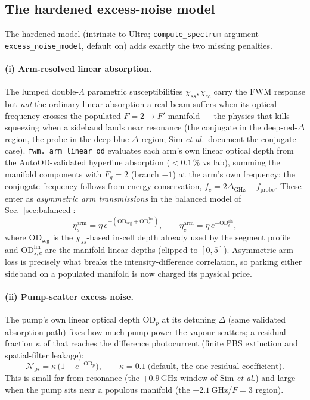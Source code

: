 \documentclass[11pt]{article}
\newcommand{\code}[1]{\texttt{#1}}
\begin{document}
\subsection{The hardened excess-noise model}

The hardened model (intrinsic to Ultra; \code{compute\_spectrum} argument
\code{excess\_noise\_model}, default on) adds exactly the two missing penalties.

\paragraph{(i) Arm-resolved linear absorption.} The lumped double-$\Lambda$
parametric susceptibilities $\chi_{ss},\chi_{cc}$ carry the FWM response but
\emph{not} the ordinary linear absorption a real beam suffers when its optical
frequency crosses the populated $F=2\!\to\!F'$ manifold --- the physics that
kills squeezing when a sideband lands near resonance (the conjugate in the
deep-red-$\Delta$ region, the probe in the deep-blue-$\Delta$ region; Sim
\emph{et al.}\ document the conjugate case). \code{fwm.\_arm\_linear\_od}
evaluates each arm's own linear optical depth from the AutoOD-validated
hyperfine absorption ($<0.1\,\%$ vs lab), summing the manifold components with
$F_g=2$ (branch $-1$) at the arm's own frequency; the conjugate frequency
follows from energy conservation, $f_c=2\Delta_{\text{GHz}}-f_{\text{probe}}$.
These enter as \emph{asymmetric arm transmissions} in the balanced model of
Sec.~\ref{sec:balanced}:
\begin{equation}
\eta_s^{\text{arm}}=\eta\,e^{-(\mathrm{OD}_{\text{seg}}
+\mathrm{OD}^{\text{lin}}_{s})},
\qquad
\eta_c^{\text{arm}}=\eta\,e^{-\mathrm{OD}^{\text{lin}}_{c}},
\label{eq:armloss}
\end{equation}
where $\mathrm{OD}_{\text{seg}}$ is the $\chi_{ss}$-based in-cell depth already
used by the segment profile and $\mathrm{OD}^{\text{lin}}_{s,c}$ are the
manifold linear depths (clipped to $[0,5]$). Asymmetric arm loss is precisely
what breaks the intensity-difference correlation, so parking either sideband on
a populated manifold is now charged its physical price.

\paragraph{(ii) Pump-scatter excess noise.} The pump's own linear optical depth
$\mathrm{OD}_p$ at its detuning $\Delta$ (same validated absorption path) fixes
how much pump power the vapour scatters; a residual fraction $\kappa$ of that
reaches the difference photocurrent (finite PBS extinction and spatial-filter
leakage):
\begin{equation}
\mathcal{N}_{\text{ps}}=\kappa\,\big(1-e^{-\mathrm{OD}_p}\big),
\qquad
\kappa=0.1\ \text{(default, the one residual coefficient)}.
\label{eq:pumpscatter}
\end{equation}
This is small far from resonance (the $+0.9\,$GHz window of Sim \emph{et al.})
and large when the pump sits near a populous manifold (the
$-2.1\,$GHz/$F{=}3$ region).
\end{document}
